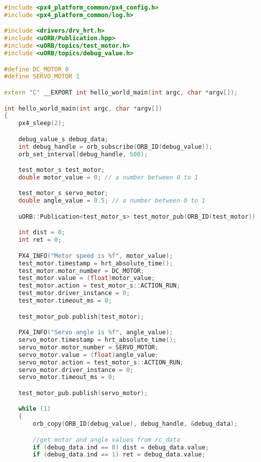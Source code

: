 \begin{lstlisting}[language=c++,caption=Part 2 C++ Code, label=list:part2_cpp]
#include <px4_platform_common/px4_config.h>
#include <px4_platform_common/log.h>

#include <drivers/drv_hrt.h>
#include <uORB/Publication.hpp>
#include <uORB/topics/test_motor.h>
#include <uORB/topics/debug_value.h>

#define DC_MOTOR 0
#define SERVO_MOTOR 1

extern "C" __EXPORT int hello_world_main(int argc, char *argv[]);

int hello_world_main(int argc, char *argv[])
{
    px4_sleep(2);

    debug_value_s debug_data;
    int debug_handle = orb_subscribe(ORB_ID(debug_value));
    orb_set_interval(debug_handle, 500);

    test_motor_s test_motor;
    double motor_value = 0; // a number between 0 to 1

    test_motor_s servo_motor;
    double angle_value = 0.5; // a number between 0 to 1

    uORB::Publication<test_motor_s> test_motor_pub(ORB_ID(test_motor));

    int dist = 0;
    int ret = 0;

    PX4_INFO("Motor speed is %f", motor_value);
    test_motor.timestamp = hrt_absolute_time();
    test_motor.motor_number = DC_MOTOR;
    test_motor.value = (float)motor_value;
    test_motor.action = test_motor_s::ACTION_RUN;
    test_motor.driver_instance = 0;
    test_motor.timeout_ms = 0;

    test_motor_pub.publish(test_motor);

    PX4_INFO("Servo angle is %f", angle_value);
    servo_motor.timestamp = hrt_absolute_time();
    servo_motor.motor_number = SERVO_MOTOR;
    servo_motor.value = (float)angle_value;
    servo_motor.action = test_motor_s::ACTION_RUN;
    servo_motor.driver_instance = 0;
    servo_motor.timeout_ms = 0;

    test_motor_pub.publish(servo_motor);

    while (1)
    {
        orb_copy(ORB_ID(debug_value), debug_handle, &debug_data);

        //get motor and angle values from rc_data
        if (debug_data.ind == 0) dist = debug_data.value;
        if (debug_data.ind == 1) ret = debug_data.value;


\end{lstlisting}
